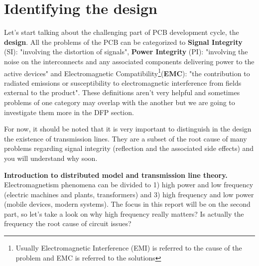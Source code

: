 \documentclass[final]{cubedoc}
\begin{document}
	\section{Identifying the design}
	
	
	Let's start talking about the challenging part of PCB development cycle, the \textbf{design}. All the problems of the PCB can be categorized to \textbf{Signal Integrity} (SI): "involving the distortion of signals", \textbf{Power Integrity} (PI): "involving the noise on the interconnects and any associated components delivering power to the active devices" and Electromagnetic Compatibility\footnote{Usually Electromagnetic Interference (EMI) is referred to the cause of the problem and EMC is referred to the solutions}(\textbf{EMC}): "the contribution to radiated emissions or susceptibility to electromagnetic interference from fields external to the product". These definitions aren't very helpful and sometimes problems of one category may overlap with the another but we are going to investigate them more in the DFP section.
	
	
	For now, it should be noted that it is very important to distinguish in the design the existence of transmission lines. They are a subset of the root cause of many problems regarding signal integrity (reflection and the associated side effects) and you will understand why soon.
	
	\textbf{Introduction to distributed model and transmission line theory. }
	Electromagnetism phenomena can be divided to 1) high power and low frequency (electric machines and plants, transformers) and 3) high frequency and low power (mobile devices, modern systems). The focus in this report will be on the second part, so let's take a look on why high frequency really matters? Is actually the frequency the root cause of circuit issues?
	
\end{document}
